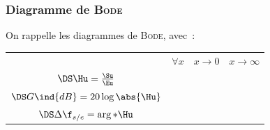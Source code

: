 \documentclass[../../main/main.tex]{subfiles}
\begin{document}
\subsubsection{Diagramme de \textsc{Bode}}
On rappelle les diagrammes de \textsc{Bode}, avec~:
\smallbreak
\noindent
\begin{minipage}{\linewidth}
	\begin{center}
		\begin{tabularx}{\linewidth}{cYYY}
			\toprule
			 &
			$\forall x$
			 &
			$x\to 0$
			 &
			$x\to\infty$
			\\
			\addlinespace[0.5em]
			\cmidrule(lr){2-4}
			$\DS\Hu = \frac{\Su}{\Eu}$
			 &
			 &
			 &
			\\
			\addlinespace[0.5em]
			$\DS G\ind{dB} = 20 \log \abs{\Hu}$
			 &
			 &
			 &
			\\
			\addlinespace[0.5em]
			$\DS\Delta\f_{s/e} = \arg*{\Hu}$
			 &
			 &
			 &
			\\
			\bottomrule
		\end{tabularx}
		\label{tab:rcc}
	\end{center}
\end{minipage}
\end{document}
